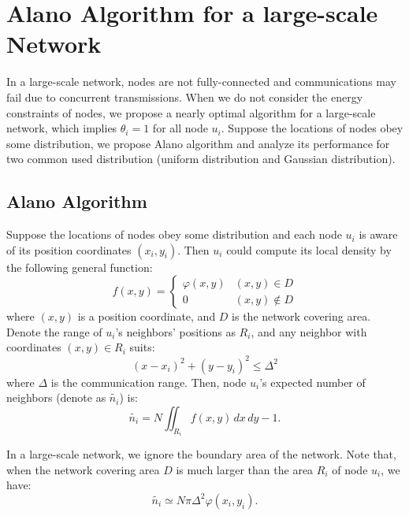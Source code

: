 \section{Alano Algorithm for a large-scale Network}
\label{PCN}


In a large-scale network, nodes are not fully-connected and communications may fail due to concurrent transmissions. 
When we do not consider the energy constraints of nodes, we propose a nearly optimal algorithm for a large-scale network, which implies $\theta_i = 1$ for all node $u_i$.
Suppose the locations of nodes obey some distribution, we propose Alano algorithm and analyze its performance for two common used distribution (uniform distribution and Gaussian distribution).

\subsection{Alano Algorithm}
Suppose the locations of nodes obey some distribution and each node $u_i$ is aware of its position coordinates $(x_i, y_i)$.
Then $u_i$ could compute its local density by the following general function: %
$$f(x,y)=
\begin{cases}
\varphi(x,y)& (x,y)\in D\\
0& (x,y)\notin D
\end{cases}$$
where $(x,y)$ is a position coordinate, and $D$ is the network covering area.
Denote the range of $u_i$'s neighbors' positions as $R_i$,  and any neighbor with coordinates $(x,y) \in R_i$ suits:
$$
(x-x_i)^2+(y-y_i)^2 \leq \Delta^2
$$
where $\Delta$ is the communication range. Then, node $u_i$'s expected number of neighbors (denote as $\widetilde{n_i}$) is:
$$
\widetilde{n_i} = N\iint_{R_i} f(x,y)\,dx\,dy - 1.
$$

In a large-scale network, we ignore the boundary area of the network.  %
Note that, when the network covering area $D$ is much larger than the area $R_i$ of node $u_i$, we have:
\begin{equation}
\label{eqnNB}
\widetilde{n_i} \simeq N\pi \Delta^2 \varphi(x_i,y_i).
\end{equation}


